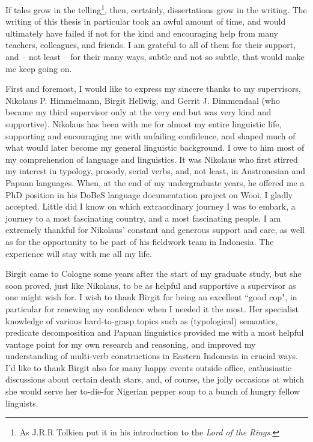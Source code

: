 
If tales grow in the telling\footnote{As J.R.R Tolkien put it in his introduction to the \textit{Lord of the Rings}.}, then, certainly, dissertations grow in the writing. The writing of this thesis in particular took an awful amount of time, and would ultimately have failed if not for the kind and encouraging help from many teachers, colleagues, and friends. I am grateful to all of them for their support, and -- not least -- for their many ways, subtle and not so subtle, that would make me keep going on.

First and foremost, I would like to express my sincere thanks to my supervisors, Nikolaus P. Himmelmann, Birgit Hellwig, and Gerrit J. Dimmendaal (who became my third supervisor only at the very end but was very kind and supportive). Nikolaus has been with me for almost my entire linguistic life, supporting and encouraging me with unfailing confidence, and shaped much of what would later become my general linguistic background. I owe to him most of my comprehension of language and linguistics. It was Nikolaus who first stirred my interest in typology, prosody, serial verbs, and, not least, in Austronesian and Papuan languages. When, at the end of my undergraduate years, he offered me a PhD position in his DoBeS language documentation project on Wooi, I gladly accepted. Little did I know on which extraordinary journey I was to embark, a journey to a most fascinating country, and a most fascinating people. I am extremely thankful for Nikolaus' constant and generous support and care, as well as for the opportunity to be part of his fieldwork team in Indonesia. The experience will stay with me all my life.

Birgit came to Cologne some years after the start of my graduate study, but she soon proved, just like Nikolaus, to be as helpful and supportive a supervisor as one might wish for. I wish to thank Birgit for being an excellent ``good cop", in particular for renewing my confidence when I needed it the most. Her specialist knowledge of various hard-to-grasp topics such as (typological) semantics, predicate decomposition and Papuan linguistics provided me with a most helpful vantage point for my own research and reasoning, and improved my understanding of multi-verb constructions in Eastern Indonesia in crucial ways. I'd like to thank Birgit also for many happy events outside office, enthusiastic discussions about certain death stars, and, of course, the jolly occasions at which she would serve her to-die-for Nigerian pepper soup to a bunch of hungry fellow linguists.

